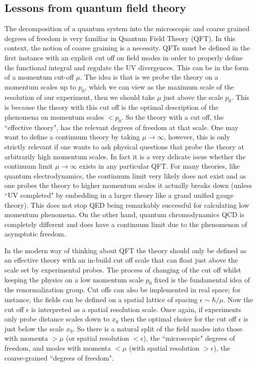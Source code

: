 \documentclass[12pt]{article}
\begin{document}
\subsection{Lessons from quantum field theory}

The decomposition of a quantum system into the microscopic and coarse grained degrees of freedom
is very familiar in Quantum Field Theory (QFT). In this context, the notion of coarse graining is
a necessity. QFTs must be defined in the first instance with an explicit cut off on field modes in order to properly define the functional integral and regulate the UV divergences.
This can be in the form of a momentum cut-off $\mu$. The idea is that is we probe the theory on a momentum scales up to $p_0$, which we can view as the maximum scale of the resolution of our experiment, then we should take $\mu$ just above the scale $p_0$. This is because the theory with this cut off is the optimal description of the phenomena on momentum scales $<p_0$. So the theory with a cut off, the ``effective theory", has the relevant degrees of freedom at that scale. One may want to define a continuum theory by taking $\mu\to\infty$, however, this is only strictly relevant if one wants to ask physical questions that probe the theory at arbitrarily high momentum scales. In fact it is a very delicate issue whether the continuum limit $\mu\to\infty$ exists in any particular QFT.
For many theories, like quantum electrodynamics, the continuum limit very likely does not exist and as one probes the theory to higher momentum scales it actually breaks down (unless ``UV completed" by embedding in a larger theory like a grand unified gauge theory). This does not stop QED being remarkably successful for calculating low momentum phenomena. On the other hand, quantum chromodynamics QCD is completely different and does have a continuum limit due to the phenomenon of asymptotic freedom.

In the modern
way of thinking about QFT
the theory should only be defined as an effective theory with an in-build cut off scale that 
can float just above the scale set by experimental probes.
The process of changing of the cut off whilst keeping the physics on a low momentum scale $p_0$  fixed 
is the fundamental idea of the 
renormalization group. Cut offs can also be implemented in real space; for instance, the fields can be defined on a spatial lattice of spacing $\epsilon\sim\hbar/\mu$. Now the cut off $\epsilon$ is interpreted as a spatial resolution scale. Once again, if experiments only probe distance scales down to $x_0$ then the optimal choice for the cut off $\epsilon$ is just below the scale $x_0$. So there is a natural split of the field modes into those with momenta $>\mu$ (or spatial resolution $<\epsilon$), the ``microscopic" degrees of freedom, and modes with momenta $<\mu$ (with spatial resolution $>\epsilon$), the coarse-grained ``degrees of freedom". 
\end{document}
